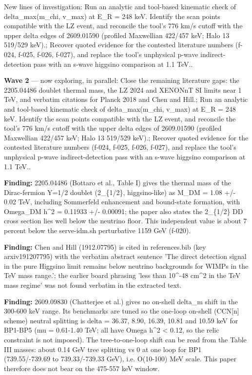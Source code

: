 \documentclass[11pt,a4paper]{article}
\begin{document}
New lines of investigation: Run an analytic and tool-based kinematic check of delta\_max(m\_chi, v\_max) at E\_R = 248 keV. Identify the scan points compatible with the LZ event, and reconcile the tool's 776 km/s cutoff with the upper delta edges of 2609.01590 (profiled Maxwellian 422/457 keV; Halo 13 519/529 keV).; Recover quoted evidence for the contested literature numbers (f-024, f-025, f-026, f-027), and replace the tool's unphysical p-wave indirect-detection pass with an s-wave higgsino comparison at 1.1 TeV..

\textbf{Wave 2} --- now exploring, in parallel: Close the remaining literature gaps: the 2205.04486 doublet thermal mass, the LZ 2024 and XENONnT SI limits near 1 TeV, and verbatim citations for Planck 2018 and Chen and Hill.; Run an analytic and tool-based kinematic check of delta\_max(m\_chi, v\_max) at E\_R = 248 keV. Identify the scan points compatible with the LZ event, and reconcile the tool's 776 km/s cutoff with the upper delta edges of 2609.01590 (profiled Maxwellian 422/457 keV; Halo 13 519/529 keV).; Recover quoted evidence for the contested literature numbers (f-024, f-025, f-026, f-027), and replace the tool's unphysical p-wave indirect-detection pass with an s-wave higgsino comparison at 1.1 TeV..

\textbf{Finding:} 2205.04486 (Bottaro et al., Table I) gives the thermal mass of the Dirac-fermion Y=1/2 doublet (2\_\{1/2\}, higgsino-like) as M\_DM = 1.08 +/- 0.02 TeV, including Sommerfeld enhancement and bound-state formation, with Omega\_DM h\textasciicircum{}2 = 0.11933 +/- 0.00091; the paper also states the 2\_\{1/2\} DD cross section lies well below the neutrino floor. This independent value is about 7 percent below the serve-idm.sh perturbative 1159 GeV (f-020).

\textbf{Finding:} Chen and Hill (1912.07795) is cited in references.bib (key arxiv191207795) with the verbatim abstract sentence 'The direct detection signal in the pure Higgsino limit remains below neutrino backgrounds for WIMPs in the TeV mass range.'; the earlier board phrasing 'less than 10\textasciicircum{}-48 cm\textasciicircum{}2 in the TeV mass regime' was not found verbatim in the extracted text.

\textbf{Finding:} 2609.09830 (Chatterjee et al.) gives no on-shell delta\_m shift in the 300-600 keV range. Its benchmarks are tuned so the one-loop on-shell (CCN[n] scheme) neutral splitting is delta = 36.37, 8.90, 16.39, 10.81 and 10.59 keV for BP1-BP5 (\textbar{}mu\textbar{} = 0.61-1.40 TeV; all have Omega h\textasciicircum{}2 \textless{} 0.12, so the relic constraint is not imposed). The tree-to-one-loop shift can be read from the Table III masses: about 0.14 GeV tree splitting vs 0 at one loop for BP1 (739.55/-739.69 to 739.33/-739.33 GeV), i.e. O(10-100) MeV scale. This paper therefore does not bear on the 475-557 keV window.
\end{document}
